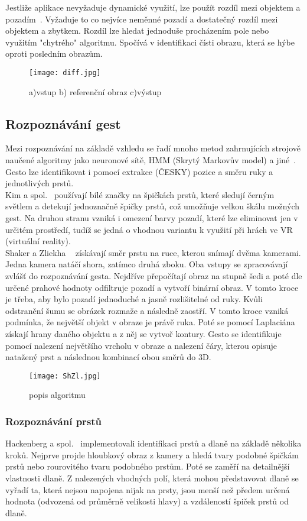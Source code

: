 Jestliže aplikace nevyžaduje dynamické využití, lze použít rozdíl mezi objektem a pozadím~\cite{14}. Vyžaduje to co nejvíce neměnné pozadí a dostatečný rozdíl mezi objektem a zbytkem. Rozdíl lze hledat jednoduše procházením pole nebo využitím "chytrého" algoritmu. Spočívá v identifikaci čísti obrazu, která se hýbe oproti posledním obrazům.
\begin{figure}[h]
\centering
\texttt{[image: diff.jpg]}
\caption{a)vstup  b) referenční obraz  c)výstup ~\cite{14} } 
\end{figure}


\subsection{Rozpoznávání gest}
Mezi rozpoznávání na základě vzhledu se řadí mnoho metod zahrnujících strojově naučené algoritmy jako neuronové sítě, HMM (Skrytý Markovův model) a jiné~\cite{3}. Gesto lze identifikovat i pomocí extrakce (ČESKY) pozice a směru ruky a jednotlivých prstů.\\

Kim a spol.~\cite{5} používají bílé značky na špičkách prstů, které sledují černým světlem a detekují jednoznačně špičky prstů, což umožňuje velkou škálu možných gest. Na druhou stranu vzniká i omezení barvy pozadí, které lze eliminovat jen v určitém prostředí, tudíž se jedná o vhodnou variantu k využití při hrách ve VR (virtuální reality).\\

Shaker a Zliekha ~\cite{12} získávají směr prstu na ruce, kterou snímají dvěma kamerami. Jedna kamera natáčí shora, zatímco druhá zboku. Oba vstupy se zpracovávají zvlášť do rozpoznávání gesta. Nejdříve přepočítají obraz na stupně šedi a poté dle určené prahové hodnoty odfiltruje pozadí a vytvoří binární obraz. V tomto kroce je třeba, aby bylo pozadí jednoduché a jasně rozlišitelné od ruky. Kvůli odstranění šumu se obrázek rozmaže a následně zaostří. V tomto kroce vzniká podmínka, že největší objekt v obraze je právě ruka. Poté se pomocí Laplaciána získají hrany daného objektu a z něj se vytvoř kontury.
Gesto se identifikuje pomocí nalezení největšího vrcholu v obraze a nalezení čáry, kterou opisuje natažený prst a následnou kombinací obou směrů do 3D. 
\begin{figure}[h]
\centering
\texttt{[image: ShZl.jpg]}
\caption{popis algoritmu~\cite{12} } 
\end{figure}

\subsubsection{Rozpoznávání prstů}
Hackenberg a spol.~\cite{12} implementovali identifikaci prstů a dlaně na základě několika kroků. Nejprve projde hloubkový obraz z kamery a hledá tvary podobné špičkám prstů nebo rourovitého tvaru podobného prstům. Poté se zaměří na detailnější vlastnosti dlaně. Z nalezených vhodných polí, která mohou představovat dlaně se vyřadí ta, která nejsou napojena nijak na prsty, jsou menší než předem určená hodnota (odvozená od průměrně velikosti hlavy) a vzdáleností špiček prstů od dlaně.\\


